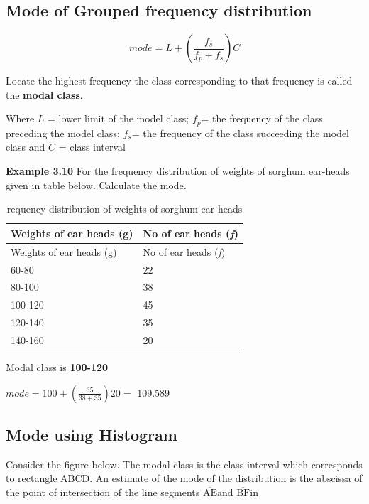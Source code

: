 \documentclass[
]{book}
\begin{document}
\hypertarget{mode-of-grouped-frequency-distribution}{%
\subsection{Mode of Grouped frequency distribution}\label{mode-of-grouped-frequency-distribution}}

\[mode = L + \left( \frac{f_{s}}{f_{p} + f_{s}} \right)C\]

Locate the highest frequency the class corresponding to that frequency
is called the \textbf{modal class}.

Where \(L\) = lower limit of the model class; \(f_{p}\)= the frequency of
the class preceding the model class; \(f_{s}\)= the frequency of the class
succeeding the model class and \(C\) = class interval

\textbf{Example 3.10} For the frequency distribution of weights of sorghum
ear-heads given in table below. Calculate the mode.

\begin{longtable}[]{@{}ll@{}}
\caption{\label{tab:earhead}requency distribution of weights of sorghum ear heads}\tabularnewline
\toprule
Weights of ear heads (g) & No of ear heads (\emph{f}) \\
\midrule
\endfirsthead
\toprule
Weights of ear heads (g) & No of ear heads (\emph{f}) \\
\midrule
\endhead
60-80 & 22 \\
80-100 & 38 \\
100-120 & 45 \\
120-140 & 35 \\
140-160 & 20 \\
\bottomrule
\end{longtable}

Modal class is \textbf{100-120}

\(mode = 100 + \left( \frac{35}{38 + 35} \right)20 =\) 109.589

\hypertarget{mode-using-histogram}{%
\subsection{\texorpdfstring{\textbf{Mode using Histogram}}{Mode using Histogram}}\label{mode-using-histogram}}

Consider the figure below. The modal class is the class interval which
corresponds to rectangle \(\text{ABCD}\). An estimate of the mode of the
distribution is the abscissa of the point of intersection of the line
segments \(\overline{\text{AE}}\)and \(\overline{\text{BF}}\)in
\end{document}
